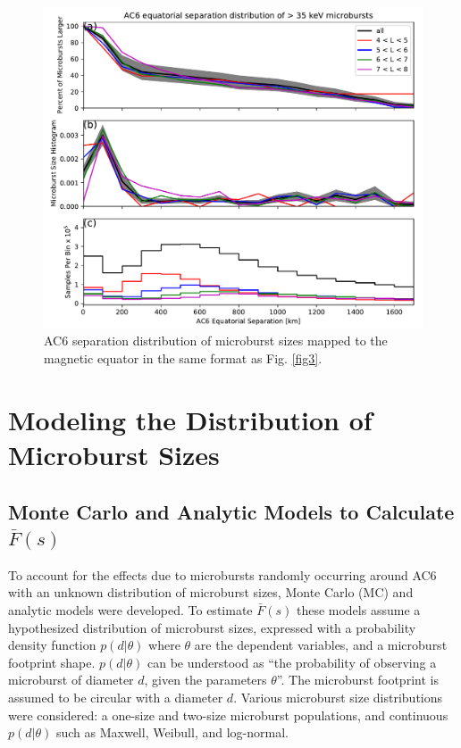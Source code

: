 \documentclass[draft]{agujournal2019}
\begin{document}
\begin{figure}
\includegraphics[width=\textwidth]{fig4.pdf}
\caption{AC6 separation distribution of microburst sizes mapped to the magnetic equator in the same format as Fig. \ref{fig3}.} 
\label{fig4}
\end{figure}

\section{Modeling the Distribution of Microburst Sizes} \label{model_section}
\subsection{Monte Carlo and Analytic Models to Calculate $\bar{F}(s)$}

To account for the effects due to microbursts randomly occurring around AC6 with an unknown distribution of microburst sizes, Monte Carlo (MC) and analytic models were developed. To estimate $\bar{F}(s)$ these models assume a hypothesized distribution of microburst sizes, expressed with a probability density function $p(d | \theta)$ where $\theta$ are the dependent variables, and a microburst footprint shape. $p(d | \theta)$ can be understood as ``the probability of observing a microburst of diameter $d$, given the parameters $\theta$''. The microburst footprint is assumed to be circular with a diameter $d$. Various microburst size distributions were considered: a one-size and two-size microburst populations, and continuous $p(d | \theta)$ such as Maxwell, Weibull, and log-normal.
\end{document}

